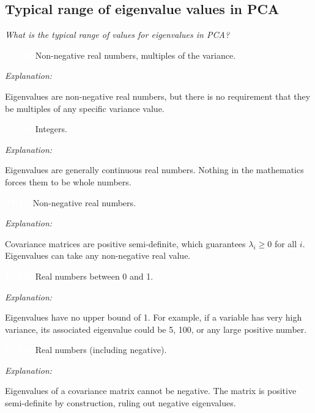 \documentclass[12pt, a4paper]{article}
\newcommand{\truelabel}{\textcolor{white}{\colorbox{truegreen}{\textbf{TRUE}}}}
\newcommand{\falselabel}{\textcolor{white}{\colorbox{falsered}{\textbf{FALSE}}}}
\newenvironment{statement}[1]{%
  \par\medskip
  \noindent #1\par\smallskip
  \noindent
}{\par}
\newenvironment{explanation}{%
  \noindent\small\color{headergray}\textit{Explanation: }%
}{\par}
\begin{document}
\subsection{Typical range of eigenvalue values in PCA}

\textit{What is the typical range of values for eigenvalues in PCA?}

\bigskip

\begin{statement}{\falselabel\quad Non-negative real numbers, multiples of the variance.}
\begin{explanation}
Eigenvalues are non-negative real numbers, but there is no requirement that they be multiples of any specific variance value.
\end{explanation}
\end{statement}

\begin{statement}{\falselabel\quad Integers.}
\begin{explanation}
Eigenvalues are generally continuous real numbers. Nothing in the mathematics forces them to be whole numbers.
\end{explanation}
\end{statement}

\begin{statement}{\truelabel\quad Non-negative real numbers.}
\begin{explanation}
Covariance matrices are positive semi-definite, which guarantees $\lambda_i \geq 0$ for all $i$. Eigenvalues can take any non-negative real value.
\end{explanation}
\end{statement}

\begin{statement}{\falselabel\quad Real numbers between 0 and 1.}
\begin{explanation}
Eigenvalues have no upper bound of 1. For example, if a variable has very high variance, its associated eigenvalue could be 5, 100, or any large positive number.
\end{explanation}
\end{statement}

\begin{statement}{\falselabel\quad Real numbers (including negative).}
\begin{explanation}
Eigenvalues of a covariance matrix cannot be negative. The matrix is positive semi-definite by construction, ruling out negative eigenvalues.
\end{explanation}
\end{statement}
\end{document}
